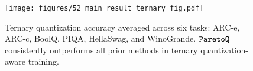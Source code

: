 \begin{figure}[t!]
    \centering
    \texttt{[image: figures/52\_main\_result\_ternary\_fig.pdf]}
    \caption{\small Ternary quantization accuracy averaged across six tasks: ARC-e, ARC-c, BoolQ, PIQA, HellaSwag, and WinoGrande. $\texttt{ParetoQ}$ consistently outperforms all prior methods in ternary quantization-aware training.}
    \label{fig:52_main_result_ternary}
\end{figure}
